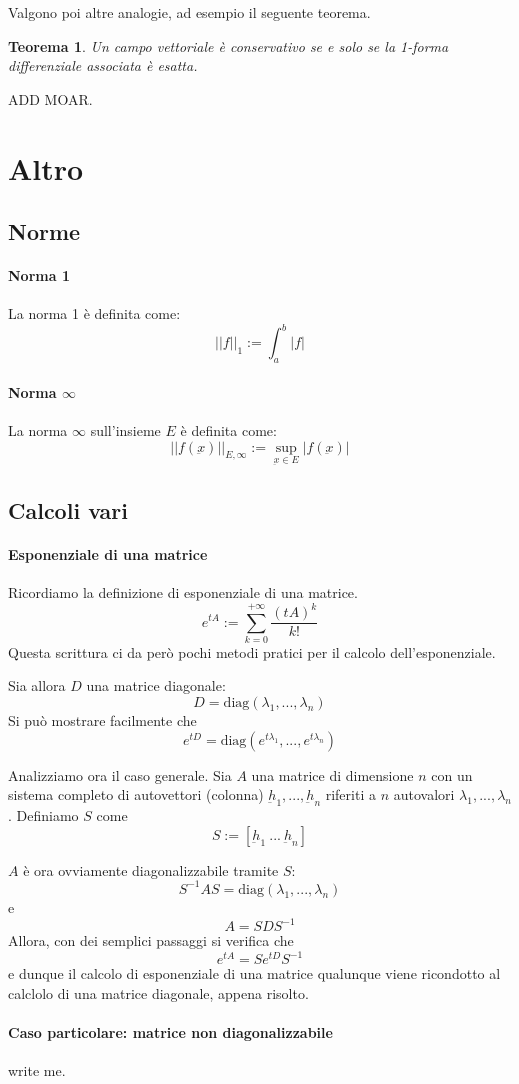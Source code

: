 \documentclass[a4paper,12pt]{article}
\newtheorem{teo}{Teorema}
\begin{document}
Valgono poi altre analogie, ad esempio il seguente teorema.
\begin{teo}
Un campo vettoriale è conservativo se e solo se la 1-forma differenziale associata è esatta.
\end{teo}


ADD MOAR.

\section{Altro}
\subsection{Norme}
\paragraph{Norma 1}
La norma 1 è definita come:
$$||f||_1 := \int_a^b|f|$$
\paragraph{Norma $\infty$}
La norma $\infty$ sull'insieme $E$ è definita come:
$$||f(\underbar{x})||_{E,\infty} := \sup_{\underbar{x}\in E} |f(\underbar{x})|$$


\subsection{Calcoli vari}
\paragraph{Esponenziale di una matrice}
Ricordiamo la definizione di esponenziale di una matrice.
$$e^{tA} := \sum_{k=0}^{+\infty} \dfrac{(tA)^k}{k!}$$
Questa scrittura ci da però pochi metodi pratici per il calcolo dell'esponenziale.

Sia allora $D$ una matrice diagonale:
$$D=\text{diag}(\lambda_1,...,\lambda_n)$$
Si può mostrare facilmente che
$$e^{tD} = \text{diag}(e^{t\lambda_1}, ..., e^{t\lambda_n})$$

Analizziamo ora il caso generale.
Sia $A$ una matrice di dimensione $n$ con un sistema completo di autovettori (colonna) $\underbar{h}_1, ..., \underbar{h}_n$ riferiti a $n$ autovalori $\lambda_1, ..., \lambda_n$. Definiamo $S$ come
$$S:=[\underbar{h}_1\ ...\ \underbar{h}_n]$$

$A$ è ora ovviamente diagonalizzabile tramite $S$:
$$S^{-1}AS=\text{diag}(\lambda_1,...,\lambda_n)$$
e
$$A = SDS^{-1}$$
Allora, con dei semplici passaggi si verifica che
$$e^{tA} = Se^{tD}S^{-1}$$
e dunque il calcolo di esponenziale di una matrice qualunque viene ricondotto al calclolo di una matrice diagonale, appena risolto.
\paragraph{Caso particolare: matrice non diagonalizzabile}
write me.
\end{document}
